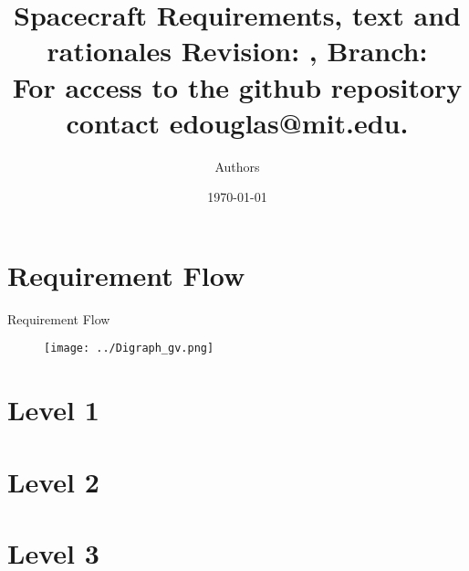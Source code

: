 \documentclass[9pt]{beamer}
\title{ Spacecraft Requirements, text and rationales
  \tiny{Revision: \gitDescribe, Branch: \gitBranch\\
    For access to the github repository contact edouglas@mit.edu.}}
\author{Authors}
\date{\today}
\begin{document}




\frame{\titlepage}

\section[Outline]{}


\section{Requirement Flow}
\begin{frame}[shrink]{Requirement Flow}
\begin{figure}[htbp]
\begin{center}
\texttt{[image: ../Digraph\_gv.png]}
\label{default}
\end{center}
\end{figure}
\end{frame}

\section{Level 1}

\section{Level 2}

\section{Level 3}

\end{document}
